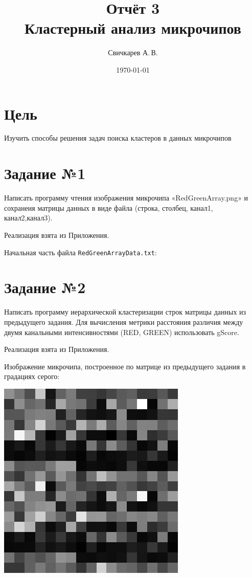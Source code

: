 \documentclass{article} %
\title{Отчёт 3\protect\\Кластерный анализ микрочипов} %
\author{Свичкарев А.\,В.} %
\date{\today} %
\begin{document}

\maketitle %

\section{Цель}
Изучить способы решения задач
поиска кластеров в данных микрочипов

\section{Задание №1}
Написать программу чтения
изображения микрочипа «RedGreenArray.png» и
сохранеия матрицы данных в виде файла
(строка, столбец, канал1, канал2,канал3).

Реализация взята из Приложения.

Начальная часть файла \verb$RedGreenArrayData.txt$:


\clearpage
\section{Задание №2}
Написать программу иерархической кластеризации
строк матрицы данных из предыдущего задания.
Для вычисления метрики расстояния различия
между двумя канальными интенсивностями
(RED, GREEN) использовать gScore.
\bigskip

Реализация взята из Приложения.
\bigskip

Изображение микрочипа,
построенное по матрице
из предыдущего задания
в градациях серого:
\bigskip

\includegraphics{im-11.png}
\end{document}
